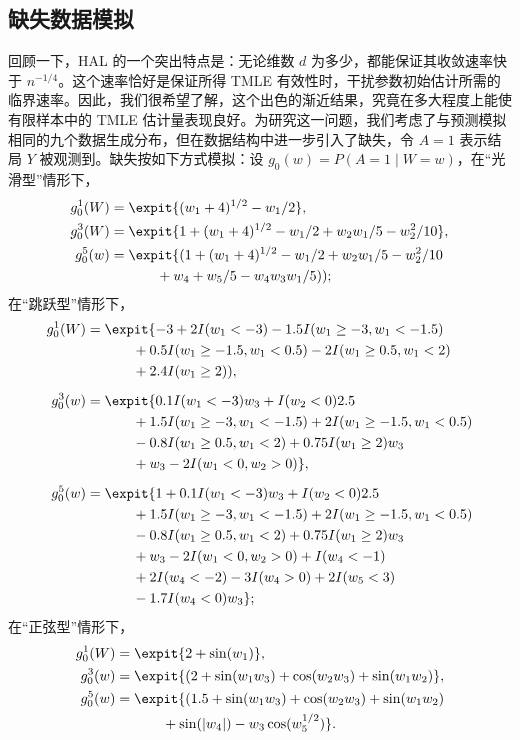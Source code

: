 \subsection{缺失数据模拟}
\label{subsec:ch06-missing-data}

回顾一下，HAL 的一个突出特点是：无论维数 $d$ 为多少，都能保证其收敛速率快于 $n^{-1/4}$。这个速率恰好是保证所得 TMLE 有效性时，干扰参数初始估计所需的临界速率。因此，我们很希望了解，这个出色的渐近结果，究竟在多大程度上能使有限样本中的 TMLE 估计量表现良好。为研究这一问题，我们考虑了与预测模拟相同的九个数据生成分布，但在数据结构中进一步引入了缺失，令 $A=1$ 表示结局 $Y$ 被观测到。缺失按如下方式模拟：设 $g_0(w)=P(A=1\mid W=w)$，在“光滑型”情形下，
\[
 \begin{aligned}
 g_0^1(W)={}&\expit\{(w_1+4)^{1/2}-w_1/2\},\\
 g_0^3(W)={}&\expit\{1+(w_1+4)^{1/2}-w_1/2+w_2w_1/5-w_2^2/10\},\\
 g_0^5(w)={}&\expit\{(1+(w_1+4)^{1/2}-w_1/2+w_2w_1/5-w_2^2/10\\
           &\qquad{}+w_4+w_5/5-w_4w_3w_1/5));
 \end{aligned}
\]
在“跳跃型”情形下，
\[
 \begin{aligned}
 g_0^1(W)={}&\expit\{-3+2I(w_1<-3)-1.5I(w_1\geq-3,w_1<-1.5)\\
           &\qquad{}+0.5I(w_1\geq-1.5,w_1<0.5)-2I(w_1\geq0.5,w_1<2)\\
           &\qquad{}+2.4I(w_1\geq2)),\\[.5em]
 g_0^3(w)={}&\expit\{0.1I(w_1<-3)w_3+I(w_2<0)2.5\\
           &\qquad{}+1.5I(w_1\geq-3,w_1<-1.5)
                       +2I(w_1\geq-1.5,w_1<0.5)\\
           &\qquad{}-0.8I(w_1\geq0.5,w_1<2)+0.75I(w_1\geq2)w_3\\
           &\qquad{}+w_3-2I(w_1<0,w_2>0)\},\\[.5em]
 g_0^5(w)={}&\expit\{1+0.1I(w_1<-3)w_3+I(w_2<0)2.5\\
           &\qquad{}+1.5I(w_1\geq-3,w_1<-1.5)
                       +2I(w_1\geq-1.5,w_1<0.5)\\
           &\qquad{}-0.8I(w_1\geq0.5,w_1<2)+0.75I(w_1\geq2)w_3\\
           &\qquad{}+w_3-2I(w_1<0,w_2>0)+I(w_4<-1)\\
           &\qquad{}+2I(w_4<-2)-3I(w_4>0)+2I(w_5<3)\\
           &\qquad{}-1.7I(w_4<0)w_3\};
 \end{aligned}
\]
在“正弦型”情形下，
\[
 \begin{aligned}
 g_0^1(W)={}&\expit\{2+\sin(w_1)\},\\
 g_0^3(w)={}&\expit\{(2+\sin(w_1w_3)+\cos(w_2w_3)+\sin(w_1w_2)\},\\
 g_0^5(w)={}&\expit\{(1.5+\sin(w_1w_3)+\cos(w_2w_3)+\sin(w_1w_2)\\
           &\qquad{}+\sin(|w_4|)-w_3\cos(w_5^{1/2})\}.
 \end{aligned}
\]

